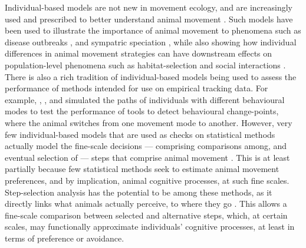 Individual-based models are not new in movement ecology, and are increasingly used and prescribed to better understand animal movement \citep[see a review in][]{deangelis2019}.
Such models have been used to illustrate the importance of animal movement to phenomena such as disease outbreaks \citep{white2018}, and sympatric speciation \citep{getz2015}, while also showing how individual differences in animal movement strategies can have downstream effects on population-level phenomena such as habitat-selection and social interactions \citep{spiegel2017,spiegel2016a}.
There is also a rich tradition of individual-based models being used to assess the performance of methods intended for use on empirical tracking data.
For example, \citealt{gurarie2016}, \citealt{michelot2016}, and \citealt{patin2020a} simulated the paths of individuals with different behavioural modes to test the performance of tools to detect behavioural change-points, where the animal switches from one movement mode to another.
However, very few individual-based models that are used as checks on statistical methods actually model the fine-scale decisions --- comprising comparisons among, and eventual selection of --- steps that comprise animal movement \citep[but see recently][]{vissat2021}.
This is at least partially because few statistical methods seek to estimate animal movement preferences, and by implication, animal cognitive processes, at such fine scales.
Step-selection analysis has the potential to be among these methods, as it directly links what animals actually perceive, to where they go \citep[see recently][]{aben2021}.
This allows a fine-scale comparison between selected and alternative steps, which, at certain scales, may functionally approximate individuals' cognitive processes, at least in terms of preference or avoidance.

